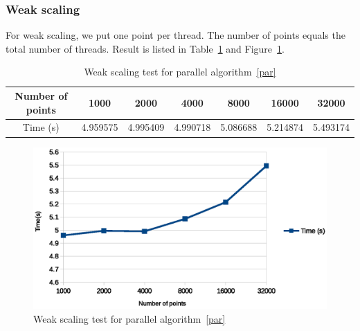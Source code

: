 \subsubsection{Weak scaling}
For weak scaling, we put one point per thread. The number of points equals the total number of threads.
Result is listed in Table~\ref{tab:weak-scaling} and Figure~\ref{fig:weak_scaling}.
\begin{table}[ht]
  \centering
  \begin{tabular}{|c|c|c|c|c|c|c|}
    \hline
    Number of points	& 1000	& 2000	& 4000	& 8000	& 16000	& 32000 \\
    \hline
    Time (s)	 &4.959575	&4.995409	&4.990718	&5.086688	&5.214874	&5.493174\\
    \hline
  \end{tabular}
  \label{tab:weak-scaling}
  \caption{Weak scaling test for parallel algorithm~\ref{par}}
\end{table}
\begin{figure}[!h]
  \centering
  \includegraphics[width=\linewidth]{fig/weak_scaling}
  \caption{Weak scaling test for parallel algorithm~\ref{par}}
  \label{fig:weak_scaling}
\end{figure}

